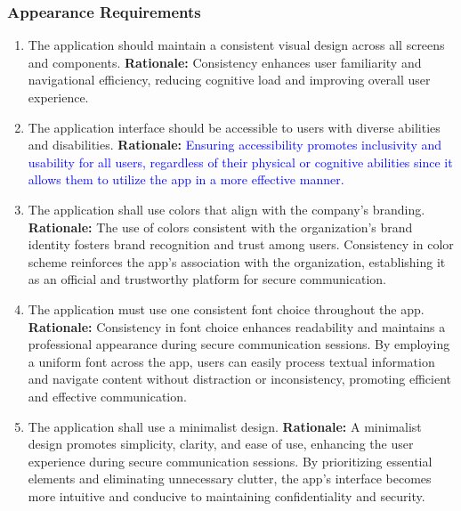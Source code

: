 \documentclass[]{article}
\begin{document}
\subsubsection{Appearance Requirements}
\label{ssub:appearance_requirements}
\begin{enumerate}[{LF-A}1. ]
	\item The application should maintain a consistent visual design across all screens and components. \newline
	      \textbf{Rationale:} Consistency enhances user familiarity and navigational efficiency, reducing cognitive load and improving overall user experience.
	\item The application interface should be accessible to users with diverse abilities and disabilities. \newline
	      \textbf{Rationale:} \textcolor{blue}{Ensuring accessibility promotes inclusivity and usability for all users, regardless of their physical or cognitive abilities since it allows them to utilize the app in a more effective manner.}
	\item The application shall use colors that align with the company’s branding. \newline
	      \textbf{Rationale:} The use of colors consistent with the organization's brand identity fosters brand recognition and trust among users. Consistency in color scheme reinforces the app's association with the organization, establishing it as an official and trustworthy platform for secure communication.
	\item The application must use one consistent font choice throughout the app. \newline
	      \textbf{Rationale:} Consistency in font choice enhances readability and maintains a professional appearance during secure communication sessions. By employing a uniform font across the app, users can easily process textual information and navigate content without distraction or inconsistency, promoting efficient and effective communication.
	\item The application shall use a minimalist design. \newline
	      \textbf{Rationale:} A minimalist design promotes simplicity, clarity, and ease of use, enhancing the user experience during secure communication sessions. By prioritizing essential elements and eliminating unnecessary clutter, the app's interface becomes more intuitive and conducive to maintaining confidentiality and security.
\end{enumerate}
\end{document}
